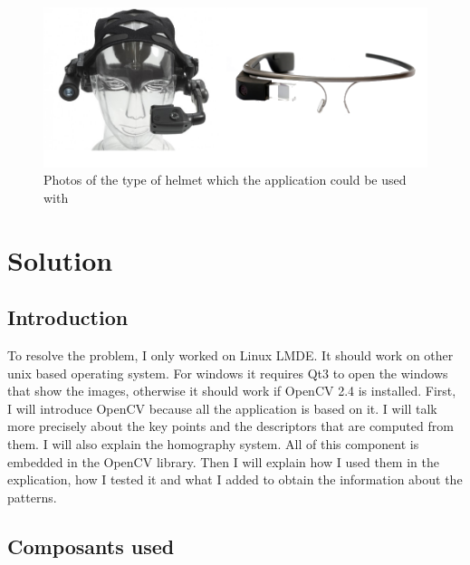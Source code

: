 \documentclass[english,a4paper,11pt]{report}
\begin{document}
		\begin{figure}[h]
			\begin{center}
				\includegraphics[scale=0.41]{images_not_compressed/helmet.png}
				\caption{Photos of the type of helmet which the application could be used with}
			\end{center}
		\end{figure}
	
		
	\chapter{Solution}
	\section{Introduction}
	\par To resolve the problem, I only worked on Linux LMDE. It should work on other unix based operating system. For windows it requires Qt3 to open the windows that show the images, otherwise it should work if OpenCV 2.4 is installed.
First, I will introduce OpenCV because all the application is based on it. I will talk more precisely about the key points and the descriptors that are computed from them. I will also explain the homography system. All of this component is embedded in the OpenCV library.
Then I will explain how I used them in the explication, how I tested it and what I added to obtain the information about the patterns.
	
	\section{Composants used}
	
\end{document}
